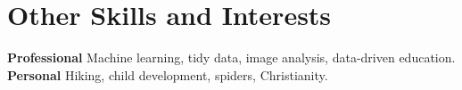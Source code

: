 \documentclass[]{cv-style}          %
\begin{document}
\section{Other Skills and Interests}
  \vspace{-0.2cm}

  \textbf{Professional} \hspace{0.05cm} Machine learning, tidy data, image analysis, data-driven education. \\
  \textbf{Personal} \hspace{0.57cm} Hiking, child development, spiders, Christianity.
  

\end{document}
